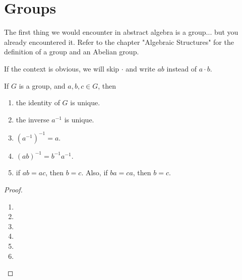 

    \section{Groups}
    
    The first thing we would encounter in abstract algebra is a group... but you already encountered it. Refer to the chapter "Algebraic Structures" for the definition of a group and an Abelian group.
    
    If the context is obvious, we will skip $\cdot$ and write $ab$ instead of $a \cdot b$.
    
    \begin{thm} \label{thm_group_basics}
        If $G$ is a group, and $a,b,c \in G$, then \begin{enumerate}
            \item the identity of $G$ is unique.
            \item the inverse $a^{-1}$ is unique.
            \item $(a^{-1})^{-1}=a$.
            \item $(ab)^{-1} = b^{-1}a^{-1}$.
            \item if $ab=ac$, then $b=c$. Also, if $ba=ca$, then $b=c$.
        \end{enumerate}
    \end{thm}
    
    \begin{proof}
        \begin{enumerate} \item[]
        \item
        \item
        \item
        \item
        \item
        \end{enumerate}
    \end{proof}

